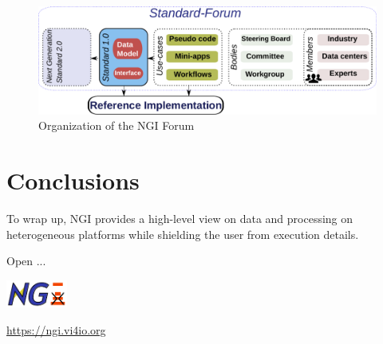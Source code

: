 \documentclass[a4paper, twocolumn]{article}
\begin{document}
\begin{figure}[b]
  \includegraphics[width=\columnwidth]{standardization}
  \caption{Organization of the NGI Forum}
  \label{fig:standardization}
\end{figure}

\section{Conclusions}


To wrap up, NGI provides a high-level view on data and processing on heterogeneous platforms while shielding the user from execution details.

Open ...

\includegraphics[width=2cm]{ngi-logo}

\noindent\url{https://ngi.vi4io.org}
\end{document}
